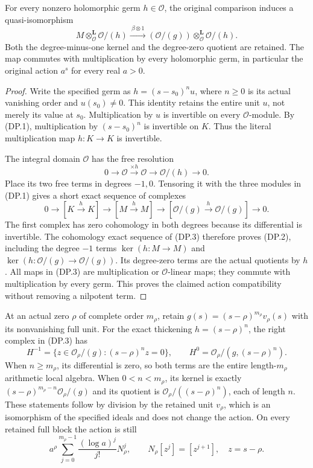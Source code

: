 \begin{proposition}
For every nonzero holomorphic germ $h\in\mathscr O$, the original
comparison induces a quasi-isomorphism
\[
 M\mathbin{\otimes^{\mathbf L}_{\mathscr O}}\mathscr O/(h)
 \xrightarrow{\ \beta\otimes1\ }
 (\mathscr O/(g))\mathbin{\otimes^{\mathbf L}_{\mathscr O}}
 \mathscr O/(h).                                      \tag{DP.2}
\]
Both the degree-minus-one kernel and the degree-zero quotient are
retained. The map commutes with multiplication by every holomorphic
germ, in particular the original action $a^s$ for every real $a>0$.
\end{proposition}
\begin{proof}
Write the specified germ as $h=(s-s_0)^nu$, where $n\geq0$ is its
actual vanishing order and $u(s_0)\ne0$. This identity retains the
entire unit $u$, not merely its value at $s_0$. Multiplication by $u$
is invertible on every $\mathscr O$-module. By (DP.1), multiplication
by $(s-s_0)^n$ is invertible on $K$. Thus the literal multiplication
map $h:K\to K$ is invertible.

The integral domain $\mathscr O$ has the free resolution
\[
 0\longrightarrow\mathscr O\xrightarrow{\times h}\mathscr O
 \longrightarrow\mathscr O/(h)\longrightarrow0.
\]
Place its two free terms in degrees $-1,0$. Tensoring it with the
three modules in (DP.1) gives a short exact sequence of complexes
\[
 0\longrightarrow[K\xrightarrow{h}K]
 \longrightarrow[M\xrightarrow{h}M]
 \longrightarrow[\mathscr O/(g)\xrightarrow{h}\mathscr O/(g)]
 \longrightarrow0.                                   \tag{DP.3}
\]
The first complex has zero cohomology in both degrees because its
differential is invertible. The cohomology exact sequence of (DP.3)
therefore proves (DP.2), including the degree $-1$ terms
$\ker(h:M\to M)$ and $\ker(h:\mathscr O/(g)\to\mathscr O/(g))$.
Its degree-zero terms are the actual quotients by $h$.
All maps in (DP.3) are multiplication or $\mathscr O$-linear maps;
they commute with multiplication by every germ. This proves the
claimed action compatibility without removing a nilpotent term.
\end{proof}

At an actual zero $\rho$ of complete order $m_\rho$, retain
$g(s)=(s-\rho)^{m_\rho}v_\rho(s)$ with its nonvanishing full unit.
For the exact thickening $h=(s-\rho)^n$, the right complex in
(DP.3) has
\[
 H^{-1}=\{z\in\mathcal O_\rho/(g):(s-\rho)^nz=0\},\qquad
 H^0=\mathcal O_\rho/(g,(s-\rho)^n).                 \tag{DP.4}
\]
When $n\geq m_\rho$, its differential is zero, so both terms are
the entire length-$m_\rho$ arithmetic local algebra. When
$0<n<m_\rho$, its kernel is exactly
$(s-\rho)^{m_\rho-n}\mathcal O_\rho/(g)$ and its quotient is
$\mathcal O_\rho/((s-\rho)^n)$, each of length $n$.
These statements follow by division by the retained unit
$v_\rho$, which is an isomorphism of the specified ideals and
does not change the action. On every retained full block the action
is still
\[
 a^{\rho}\sum_{j=0}^{m_\rho-1}
 \frac{(\log a)^j}{j!}N_\rho^j,\qquad
N_\rho[z^j]=[z^{j+1}],\quad z=s-\rho.                \tag{DP.5}
\]

